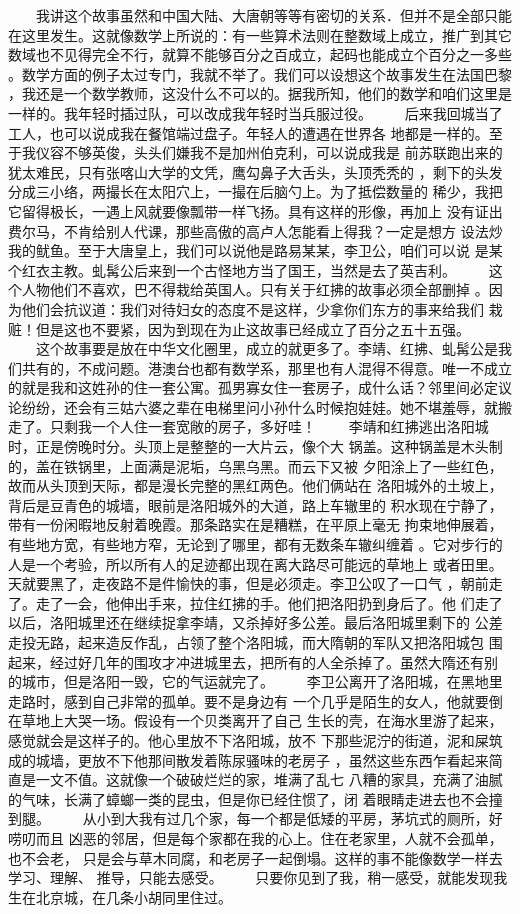  　　我讲这个故事虽然和中国大陆、大唐朝等等有密切的关系．但并不是全部只能 在这里发生。这就像数学上所说的：有一些算术法则在整数域上成立，推广到其它 数域也不见得完全不行，就算不能够百分之百成立，起码也能成立个百分之一多些 。数学方面的例子太过专门，我就不举了。我们可以设想这个故事发生在法国巴黎 ，我还是一个数学教师，这没什么不可以的。据我所知，他们的数学和咱们这里是 一样的。我年轻时插过队，可以改成我年轻时当兵服过役。 　　后来我回城当了工人，也可以说成我在餐馆端过盘子。年轻人的遭遇在世界各 地都是一样的。至于我仪容不够英俊，头头们嫌我不是加州伯克利，可以说成我是 前苏联跑出来的犹太难民，只有张喀山大学的文凭，鹰勾鼻子大舌头，头顶秃秃的 ，剩下的头发分成三小络，两撮长在太阳穴上，一撮在后脑勺上。为了抵偿数量的 稀少，我把它留得极长，一遇上风就要像瓢带一样飞扬。具有这样的形像，再加上 没有证出费尔马，不肯给别人代课，那些高傲的高卢人怎能看上得我？一定是想方 设法炒我的鱿鱼。至于大唐皇上，我们可以说他是路易某某，李卫公，咱们可以说 是某个红衣主教。虬髯公后来到一个古怪地方当了国王，当然是去了英吉利。 　　这个人物他们不喜欢，巴不得栽给英国人。只有关于红拂的故事必须全部删掉 。因为他们会抗议道：我们对待妇女的态度不是这样，少拿你们东方的事来给我们 栽赃！但是这也不要紧，因为到现在为止这故事已经成立了百分之五十五强。 　　这个故事要是放在中华文化圈里，成立的就更多了。李靖、红拂、虬髯公是我 们共有的，不成问题。港澳台也都有数学系，那里也有人混得不得意。唯一不成立 的就是我和这姓孙的住一套公寓。孤男寡女住一套房子，成什么话？邻里间必定议 论纷纷，还会有三姑六婆之辈在电梯里问小孙什么时候抱娃娃。她不堪羞辱，就搬 走了。只剩我一个人住一套宽敞的房子，多好哇！ 　　李靖和红拂逃出洛阳城时，正是傍晚时分。头顶上是整整的一大片云，像个大 锅盖。这种锅盖是木头制的，盖在铁锅里，上面满是泥垢，乌黑乌黑。而云下又被 夕阳涂上了一些红色，故而从头顶到天际，都是漫长完整的黑红两色。他们俩站在 洛阳城外的土坡上，背后是豆青色的城墙，眼前是洛阳城外的大道，路上车辙里的 积水现在宁静了，带有一份闲暇地反射着晚霞。那条路实在是糟糕，在平原上毫无 拘束地伸展着，有些地方宽，有些地方窄，无论到了哪里，都有无数条车辙纠缠着 。它对步行的人是一个考验，所以所有人的足迹都出现在离大路尽可能远的草地上 或者田里。天就要黑了，走夜路不是件愉快的事，但是必须走。李卫公叹了一口气 ，朝前走了。走了一会，他伸出手来，拉住红拂的手。他们把洛阳扔到身后了。他 们走了以后，洛阳城里还在继续捉拿李靖，又杀掉好多公差。最后洛阳城里剩下的 公差走投无路，起来造反作乱，占领了整个洛阳城，而大隋朝的军队又把洛阳城包 围起来，经过好几年的围攻才冲进城里去，把所有的人全杀掉了。虽然大隋还有别 的城市，但是洛阳一毁，它的气运就完了。 　　李卫公离开了洛阳城，在黑地里走路时，感到自己非常的孤单。要不是身边有 一个几乎是陌生的女人，他就要倒在草地上大哭一场。假设有一个贝类离开了自己 生长的壳，在海水里游了起来，感觉就会是这样子的。他心里放不下洛阳城，放不 下那些泥泞的街道，泥和屎筑成的城墙，更放不下他那间散发着陈尿骚味的老房子 ，虽然这些东西乍看起来简直是一文不值。这就像一个破破烂烂的家，堆满了乱七 八糟的家具，充满了油腻的气味，长满了蟑螂一类的昆虫，但是你已经住惯了，闭 着眼睛走进去也不会撞到腿。 　　从小到大我有过几个家，每一个都是低矮的平房，茅坑式的厕所，好唠叨而且 凶恶的邻居，但是每个家都在我的心上。住在老家里，人就不会孤单，也不会老， 只是会与草木同腐，和老房子一起倒塌。这样的事不能像数学一样去学习、理解、 推导，只能去感受。 　　只要你见到了我，稍一感受，就能发现我生在北京城，在几条小胡同里住过。 
 
